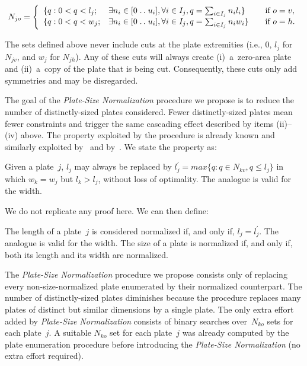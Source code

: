 \documentclass[smallextended]{svjour3}       %
\newif\iffinalversion
\newcommand{\isep}{\mathrel{{.}\,{.}}\nobreak} %
\begin{document}
{\iffinalversion\else\color{blue}\fi
\begin{equation}
N_{jo}= \left\{
\begin{array}{lllr}
  \{q: 0 < q < l_j; & \exists n_i \in [0 \isep u_i], \forall i \in I_j, q = \sum_{i\in I_j} n_i l_i \} & \quad \text{if } o = v,\\
  \{q: 0 < q < w_j; & \exists n_i \in [0 \isep u_i], \forall i \in I_j, q = \sum_{i\in I_j} n_i w_i \} & \quad \text{if } o = h.
\end{array}\right.
\end{equation}
}

The sets defined above never include cuts at the plate extremities (i.e., \(0\), \(l_j\) for \(N_{jv}\), and \(w_j\) for \(N_{jh}\)).
Any of these cuts will always create (i)~a~zero-area plate and (ii)~a~copy of the plate that is being cut.
Consequently, these cuts only add symmetries and may be disregarded.

The goal of the \emph{Plate-Size Normalization} procedure we propose is to reduce the number of distinctly-sized plates considered.
Fewer distinctly-sized plates mean fewer constraints and trigger the same cascading effect described by items (ii)--(iv) above.
The property exploited by the procedure is already known and similarly exploited by~\cite{alvarez:2009} and by~\cite{dolatabadi:2012}.
We state the property as:

\begin{proposition}
\label{pro:normalization}
Given a plate~\(j\), \(l_j\) may always be replaced by \(l^\prime_j = max\{q : q \in N_{kv}, q \leq l_j\}\) in which \(w_k = w_j\) but \(l_k > l_j\), without loss of optimality.
The analogue is valid for the width.
\end{proposition}

We do not replicate any proof here. We can then define: 

\begin{definition}
The length of a plate~\(j\) is considered normalized if, and only if, \(l_j = l^\prime_j\).
The analogue is valid for the width.
The size of a plate is normalized if, and only if, both its length and its width are normalized.
\end{definition}

The \emph{Plate-Size Normalization} procedure we propose consists only of replacing every non-size-normalized plate enumerated by their normalized counterpart.
The number of distinctly-sized plates diminishes because the procedure replaces many plates of distinct but similar dimensions by a single plate.
The only extra effort added by \emph{Plate-Size Normalization} consists of binary searches over~\(N_{ko}\) sets for each plate~\(j\).
A suitable \(N_{ko}\) set for each plate~\(j\) was already computed by the plate enumeration procedure before introducing the \emph{Plate-Size Normalization} (no extra effort required).
\end{document}
